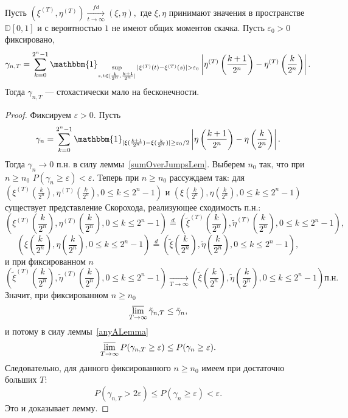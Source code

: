 \documentclass[12pt, a4paper, titlepage]{article}
\begin{document}
 \begin{lem}\label{sumOverJumpsStochasticLem}
  Пусть $(\xi^{(T)}, \eta^{(T)})\xrightarrow[t\to\infty]{fd} (\xi, \eta),$
  где $\xi, \eta$ принимают значения в пространстве $\mathbb{D}[0,1]$
  и с вероятностью $1$ не имеют общих моментов скачка. 
  Пусть $\varepsilon_0>0$ фиксировано,
  $$\gamma_{n,T}=\sum\limits_{k=0}^{2^n-1}
  \mathbbm{1}_{\sup\limits_{s, t \in [\frac{k}{2^n}, \frac{k+1}{2^n}]}
  |\xi^{(T)}(t)-\xi^{(T)}(s)|>\varepsilon_0}
  \left|\eta^{(T)}\left(\frac{k+1}{2^n}\right)-\eta^{(T)}\left(\frac{k}{2^n}\right)\right|.$$
  Тогда $\gamma_{n,T}$ --- стохастически мало на бесконечности. 
 \end{lem}
 \begin{proof}
  Фиксируем $\varepsilon>0.$
  Пусть 
  $$\gamma_n=\sum\limits_{k=0}^{2^n-1}
  \mathbbm{1}_{|\xi(\frac{k+1}{2^n})-\xi(\frac{k}{2^n})| \ge \varepsilon_0/2}
  \left|\eta\left(\frac{k+1}{2^n}\right)-\eta\left(\frac{k}{2^n}\right)\right|.$$
  Тогда $\gamma_n\to 0$ п.н. в силу леммы~\ref{sumOverJumpsLem}.
  Выберем $n_0$ так, что при $n \ge n_0$ $P(\gamma_n \ge \varepsilon)<\varepsilon.$
  Теперь при $n \ge n_0$ рассуждаем так:
  для $(\xi^{(T)}(\frac{k}{2^n}), \eta^{(T)}(\frac{k}{2^n}), 0 \le k \le 2^n-1)$
  и $(\xi(\frac{k}{2^n}), \eta(\frac{k}{2^n}), 0 \le k \le 2^n-1)$
  существует представление Скорохода, реализующее сходимость п.н.:
  $$\left(\xi^{(T)}\left(\frac{k}{2^n}\right), \eta^{(T)}\left(\frac{k}{2^n}\right), 
  0 \le k \le 2^n-1\right) \stackrel{d}{=}
  \left(\tilde{\xi}^{(T)}\left(\frac{k}{2^n}\right), \tilde{\eta}^{(T)}\left(\frac{k}{2^n}\right), 
  0 \le k \le 2^n-1\right),$$
  $$\left(\xi\left(\frac{k}{2^n}\right), \eta\left(\frac{k}{2^n}\right), 
  0 \le k \le 2^n-1\right) \stackrel{d}{=}
  \left(\tilde{\xi}\left(\frac{k}{2^n}\right), \tilde{\eta}\left(\frac{k}{2^n}\right), 
  0 \le k \le 2^n-1\right),$$
  и при фиксированном $n$
  $$\left(\tilde{\xi}^{(T)}\left(\frac{k}{2^n}\right), \tilde{\eta}^{(T)}\left(\frac{k}{2^n}\right), 
  0 \le k \le 2^n-1\right) 
  \xrightarrow[T\to\infty]{}
  \left(\tilde{\xi}\left(\frac{k}{2^n}\right), \tilde{\eta}\left(\frac{k}{2^n}\right), 
  0 \le k \le 2^n-1\right) \mbox{п.н.}$$
  Значит, при фиксированном $n \ge n_0$
  $$\varlimsup\limits_{T \to \infty}\tilde{\gamma}_{n, T} \le \tilde{\gamma}_n,$$
  и потому в силу леммы~\ref{anyALemma}
  $$\varlimsup\limits_{T \to \infty}P(\gamma_{n, T} \ge \varepsilon)\le P(\gamma_n \ge \varepsilon).$$
  Следовательно, для данного фиксированного $n \ge n_0$ имеем при достаточно больших $T$:
  $$P(\gamma_{n,T}>2\varepsilon) \le P(\gamma_n \ge \varepsilon)<\varepsilon.$$
  Это и доказывает лемму.
 \end{proof}
\end{document}
